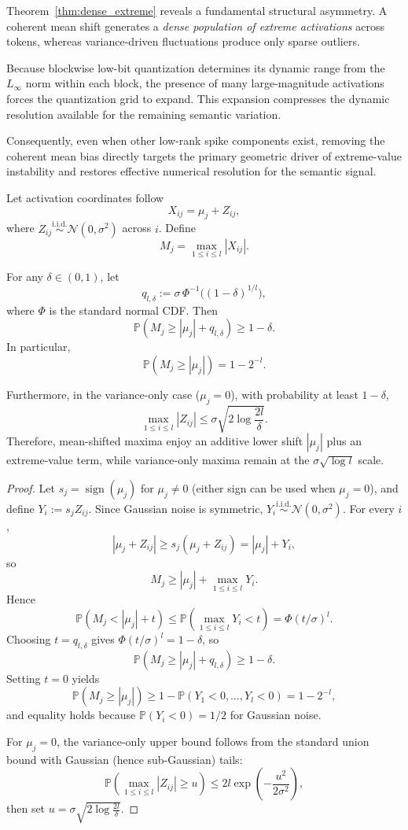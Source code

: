 Theorem~\ref{thm:dense_extreme} reveals a fundamental structural asymmetry. A coherent mean shift generates a \emph{dense population of extreme activations} across tokens, whereas variance-driven fluctuations produce only sparse outliers.

Because blockwise low-bit quantization determines its dynamic range from the $L_\infty$ norm within each block, the presence of many large-magnitude activations forces the quantization grid to expand. This expansion compresses the dynamic resolution available for the remaining semantic variation.

Consequently, even when other low-rank spike components exist, removing the coherent mean bias directly targets the primary geometric driver of extreme-value instability and restores effective numerical resolution for the semantic signal.

\begin{theorem}
\label{thm:extreme_separation}

Let activation coordinates follow
\[
X_{ij} = \mu_j + Z_{ij},
\]
where $Z_{ij} \overset{\mathrm{i.i.d.}}{\sim} \mathcal{N}(0,\sigma^2)$ across $i$.
Define
\[
M_j = \max_{1 \le i \le l} |X_{ij}|.
\]

For any $\delta \in (0,1)$, let
\[
q_{l,\delta} := \sigma\,\Phi^{-1}\!\big((1-\delta)^{1/l}\big),
\]
where $\Phi$ is the standard normal CDF. Then
\[
\mathbb{P}\!\left(M_j \ge |\mu_j| + q_{l,\delta}\right) \ge 1-\delta.
\]
In particular,
\[
\mathbb{P}\!\left(M_j \ge |\mu_j|\right) = 1-2^{-l}.
\]

Furthermore, in the variance-only case ($\mu_j=0$), with probability at least $1-\delta$,
\[
\max_{1 \le i \le l}|Z_{ij}| \le \sigma\sqrt{2\log\frac{2l}{\delta}}.
\]
Therefore, mean-shifted maxima enjoy an additive lower shift $|\mu_j|$ plus an extreme-value term, while variance-only maxima remain at the $\sigma\sqrt{\log l}$ scale.
\end{theorem}

\begin{proof}
Let $s_j = \operatorname{sign}(\mu_j)$ for $\mu_j\neq 0$ (either sign can be used when $\mu_j=0$), and define $Y_i := s_j Z_{ij}$. Since Gaussian noise is symmetric, $Y_i \overset{\mathrm{i.i.d.}}{\sim} \mathcal{N}(0,\sigma^2)$.
For every $i$,
\[
|\mu_j + Z_{ij}| \ge s_j(\mu_j + Z_{ij}) = |\mu_j| + Y_i,
\]
so
\[
M_j \ge |\mu_j| + \max_{1\le i\le l} Y_i.
\]
Hence
\[
\mathbb{P}(M_j < |\mu_j| + t)
\le \mathbb{P}\!\left(\max_{1\le i\le l} Y_i < t\right)
= \Phi(t/\sigma)^l.
\]
Choosing $t=q_{l,\delta}$ gives $\Phi(t/\sigma)^l = 1-\delta$, so
\[
\mathbb{P}(M_j \ge |\mu_j| + q_{l,\delta}) \ge 1-\delta.
\]
Setting $t=0$ yields
\[
\mathbb{P}(M_j \ge |\mu_j|) \ge 1-\mathbb{P}(Y_1<0,\dots,Y_l<0)=1-2^{-l},
\]
and equality holds because $\mathbb{P}(Y_i<0)=1/2$ for Gaussian noise.

For $\mu_j=0$, the variance-only upper bound follows from the standard union bound with Gaussian (hence sub-Gaussian) tails:
\[
\mathbb{P}\!\left(\max_{1\le i\le l}|Z_{ij}|\ge u\right)
\le 2l\exp\!\left(-\frac{u^2}{2\sigma^2}\right),
\]
then set $u=\sigma\sqrt{2\log\frac{2l}{\delta}}$.
\end{proof}

